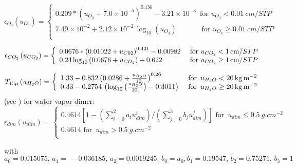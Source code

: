 \begin{equation}
\epsilon_{O_{3}}\left( u_{O_{3}} \right)=\left\{ {\begin{array}{l}
 0.209\ast \left( u_{O_{3}}+7.0\times {10}^{-5} \right)^{0.436}-3.21\times
  {10}^{-3}\, \text{ for } u_{O_{3}} < \SI{0.01}{cm}/STP \\
 7.49\times {10}^{-2}+2.12\times {10}^{-2}\, {\log}_{10}\left( u_{O_{3}}
  \right)\, \, \, \, \, \, \, \, \, \, \, \, \, \, \, \, \, \, \, \text{ for }
  {u_{O_{3}}\ge \SI{0.01}{cm}/STP} \\
 \end{array}} \right.
\end{equation}

\begin{equation}
\epsilon_{CO_{2}}\left( u_{CO_{2}} \right)=\left\{
  {\begin{array}{l l}
    0.0676\ast \left( 0.01022+u_{C02} \right)^{0.421}-0.00982 &\text{ for }
  u_{CO_{2}} < \SI{1}{cm}/STP \\
    0.24\, {\log}_{10}\left( 0.0676+u_{CO_{2}} \right)+0.622 &\text{ for } u_{CO_{2}}\ge \SI{1}{cm}/STP
 \end{array}} \right.
\end{equation}

\begin{equation}
T_{15\mu }\left( u_{H_{2}O} \right)=\left\{
  {\begin{array}{l l}
    1.33-0.832\left( 0.0286+\frac{u_{H_{2}O}}{10.} \right)^{0.26} &\text{ for } {\,
  u}_{H_{2}O} < \SI{20}{ kg.m^{-2}} \\
 0.33-0.2754\, \left( {\log}_{10}\left( \frac{u_{H_{2}O}}{10.} \right)-0.3011
    \right) &\text{ for } {\, u}_{H_{2}O}\ge \SI{20}{ kg.m^{-2}}
 \end{array}} \right.
\end{equation}
(see \cite{Veyre:1980}) for water vapor dimer:
\newline%
$\epsilon_{dim}\left( u_{dim} \right)=\left\{ {\begin{array}{l}
 0.4614\left[ 1-\left( \sum\limits_{i=0}^2 {a_{i}u_{dim}^{i}} \right)/\left(
  \sum\limits_{j=0}^3 {b_{j}u_{dim}^{j}} \right) \right] \text{ for } {\,
  u}_{dim}\le \SI{0.5 }{ g.{cm}^{-2}} \\
  0.4614 \text{ for } {\,
  u}_{dim}> \SI{0.5}{ g.{cm}^{-2}} \\
 \end{array}} \right.$

with
\begin{equation}
a_{0}=0.015075,\, a_{1}=\, -0.036185,\, a_{2}=0.0019245,\,
b_{0}=a_{0},b_{1}=0.19547,\, b_{2}=0.75271,\, b_{3}=1
\end{equation}

